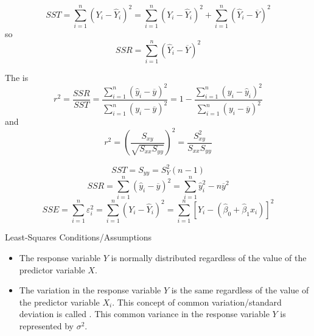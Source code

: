\documentclass[12pt, a4paper, twoside, openright, titlepage]{book}
\begin{document}
\begin{rmk}{}{}
    \begin{equation*}
        SST = \sum_{i=1}^n(Y_i - \hat{Y}_i)^2 = \sum_{i=1}^n(Y_i - \hat{Y}_i)^2 + \sum_{i=1}^n(\hat{Y}_i - \overline{Y})^2
    \end{equation*}
    so $$SSR = \sum_{i=1}^n(\hat{Y}_i - \overline{Y})^2$$
\end{rmk}


\begin{defn}{}{}
    The  is \begin{equation*}
        r^2 = \frac{SSR}{SST} = \frac{\sum_{i=1}^n(\hat{y}_i - \overline{y})^2}{\sum_{i=1}^n(y_i - \overline{y})^2} = 1 -\frac{\sum_{i=1}^n(y_i - \hat{y}_i)^2}{\sum_{i=1}^n(y_i - \overline{y})^2}  
    \end{equation*}
    and \begin{equation*}
        r^2 = \left(\frac{S_{xy}}{\sqrt{S_{xx}S_{yy}}}\right)^2 = \frac{S_{xy}^2}{S_{xx}S_{yy}}
    \end{equation*}
\end{defn}

\begin{note}{}{}
    \begin{equation*}
        SST = S_{yy} = S_Y^2(n-1)
    \end{equation*}
    \begin{equation*}
        SSR = \sum_{i=1}^n(\hat{y}_i - \overline{y})^2 = \sum_{i=1}^n\hat{y}_i^2 - n\overline{y}^2
    \end{equation*}
    \begin{equation*}
        SSE = \sum_{i=1}^n\varepsilon_i^2 = \sum_{i=1}^n(Y_i-\hat{Y}_i)^2 = \sum_{i=1}^n[Y_i - (\hat{\beta}_0 + \hat{\beta}_1x_i)]^2
    \end{equation*}
\end{note}

\begin{rmk}{Least-Squares Conditions/Assumptions}{}
    \leavevmode
    \begin{itemize}
        \item The response variable $Y$ is normally distributed regardless of the value of the predictor variable $X$.
        \item The variation in the response variable $Y$ is the same regardless of the value of the predictor variable $X_i$. This concept of common variation/standard deviation is called . This common variance in the response variable $Y$ is represented by $\sigma^2$.
    \end{itemize}
\end{rmk}
\end{document}
